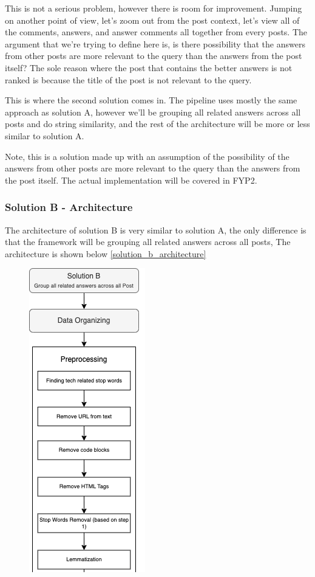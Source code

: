 This is not a serious problem, however there is room for improvement. Jumping on another point of view, let's zoom out from the post context, let's view all of the comments, answers, and answer comments all together from every posts. The argument that we're trying to define here is, is there possibility that the answers from other posts are more relevant to the query than the answers from the post itself? The sole reason where the post that contains the better answers is not ranked is because the title of the post is not relevant to the query.

This is where the second solution comes in. The pipeline uses mostly the same approach as solution A, however we'll be grouping all related answers across all posts and do string similarity, and the rest of the architecture will be more or less similar to solution A. 

Note, this is a solution made up with an assumption of the possibility of the answers from other posts are more relevant to the query than the answers from the post itself. The actual implementation will be covered in FYP2. 

\subsubsection{Solution B - Architecture}
The architecture of solution B is very similar to solution A, the only difference is that the framework will be grouping all related answers across all posts, The architecture is shown below \ref*{solution_b_architecture}

\pagebreak
\begin{figure}[H]
  \centering
  \noindent \includegraphics[scale=1]{slice_solution-b_1.png}
\end{figure}

